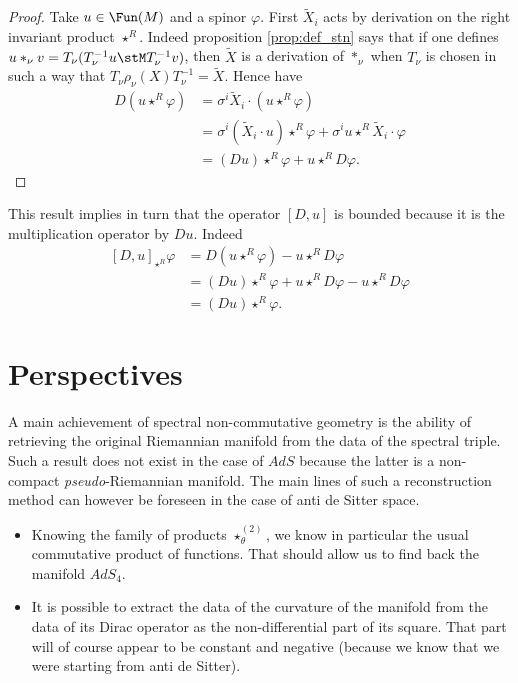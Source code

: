 \begin{proof}
	Take $u\in\Fun(M)$ and a spinor $\varphi$. First $\tilde X_i$ acts by derivation on the right invariant product $\star^R$. Indeed proposition \ref{prop:def_stn} says that if one defines $u\ast_{\nu} v=T_{\nu}(T_{\nu}^{-1}u\stM T_{\nu}^{-1}v)$, then $\tilde X$ is a derivation of $\ast_{\nu}$ when $T_{\nu}$ is chosen in such a way that $T_{\nu}\rho_{\nu}(X)T_{\nu}^{-1}=\tilde X$. Hence have
\[ 
\begin{split}
D(u\star^R\varphi)&=\sigma^i\tilde X_i\cdot(u\star^R\varphi)\\
		&=\sigma^i(\tilde X_i\cdot u)\star^R\varphi+\sigma^i u\star^R\tilde X_i\cdot \varphi\\
		&=(Du)\star^R\varphi+u\star^R D\varphi.
\end{split}  
\]

\end{proof}

This result implies in turn that the operator $[D,u]$ is bounded because it is the multiplication operator by $Du$. Indeed
\[ 
\begin{split}
  [D,u]_{\star^R}\varphi
		&=D(u\star^R \varphi)-u\star^R D\varphi\\
		&= (Du)\star^R\varphi+u\star^R D\varphi-u\star^R D\varphi\\
		&=(Du)\star^R\varphi.
\end{split}  
\]

\section{Perspectives}

A main achievement of spectral non-commutative geometry is the ability of retrieving the original Riemannian manifold from the data of the spectral triple. Such a result does not exist in the case of $AdS$ because the latter is a non-compact \emph{pseudo}-Riemannian manifold. The main lines of such a reconstruction method can however be foreseen in the case of anti de Sitter space.
\begin{itemize}
\item Knowing the family of products $\star^{(2)}_{\theta}$, we know in particular the usual commutative product of functions. That should allow us to find back the manifold $AdS_4$.
\item It is possible to extract the data of the curvature of the manifold from the data of its Dirac operator as the non-differential part of its square. That part will of course appear to be constant and negative (because we know that we were starting from anti de Sitter).
\end{itemize}

